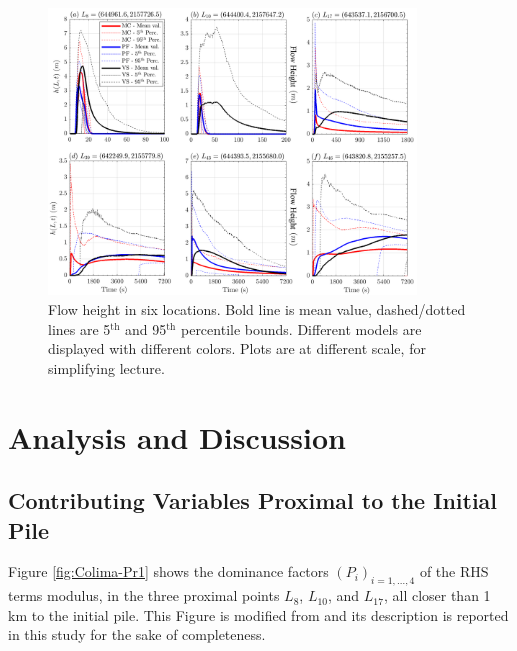\documentclass{article}
\begin{document}
\begin{figure}[H]
         \centering
        \includegraphics[width=0.87\textwidth]{Height.png}
        \caption{Flow height in six locations. Bold line is mean value, dashed/dotted lines are 5$^{\mathrm{th}}$ and 95$^{\mathrm{th}}$ percentile bounds. Different models are displayed with different colors. Plots are at different scale, for simplifying lecture.}
        \label{fig:Colima-H}
\end{figure}

\section{Analysis and Discussion}\label{Hq2}
\subsection{Contributing Variables Proximal to the Initial Pile}
Figure \ref{fig:Colima-Pr1} shows the dominance factors $(P_i)_{i=1,\dots,4}$ of the RHS terms modulus, in the three proximal points $L_{8}$, $L_{10}$, and $L_{17}$, all closer than 1 km to the initial pile. This Figure is modified from \cite{Patra2018b} and its description is reported in this study for the sake of completeness.
\end{document}
